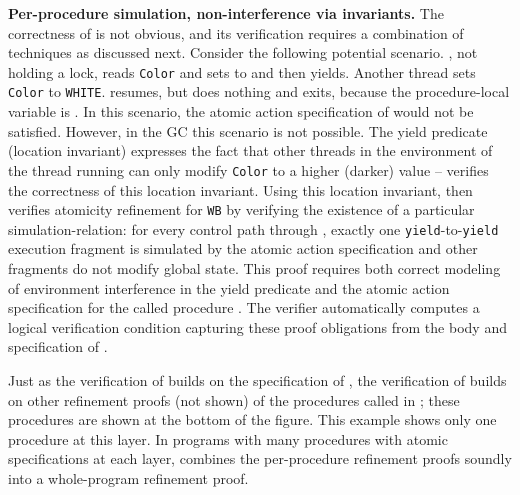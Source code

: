 {\bf Per-procedure simulation, non-interference via invariants.}
The correctness of  is not obvious, and its verification
requires a combination of techniques as discussed next. 
Consider the following potential scenario. 
, not holding a lock, reads {\tt Color} and
sets  to  and then yields. Another thread sets {\tt Color} to
{\tt WHITE}.  resumes, but does nothing and exits,
because the procedure-local variable  is . In this scenario, the atomic action
specification of  would not be satisfied. However, in the GC this
scenario is not possible. 
The yield predicate (location invariant) expresses the fact that
other threads in the environment of the thread running  can
only modify {\tt Color} to a higher (darker) value -- \civl verifies the correctness
of this location invariant.
Using this location invariant, \civl then verifies atomicity
refinement for {\tt WB} by verifying the existence of a particular simulation-relation:
for every control path through , exactly one {\tt yield}-to-{\tt yield} execution
fragment is simulated by the atomic action specification and other fragments do not modify
global state. 
This proof requires both correct modeling of environment interference in the yield predicate
and the atomic action specification for the called procedure .
The \civl verifier automatically computes a logical verification condition capturing
these proof obligations from the body and specification of .

Just as the verification of  builds on the specification of ,
the verification of  builds on other refinement proofs (not shown) 
of the procedures called in ;
these procedures are shown at the bottom of the figure. 
This example shows only one procedure at this layer. In programs
with many procedures with atomic specifications at each layer,
\civl combines the per-procedure refinement proofs soundly into a
whole-program refinement proof. 

